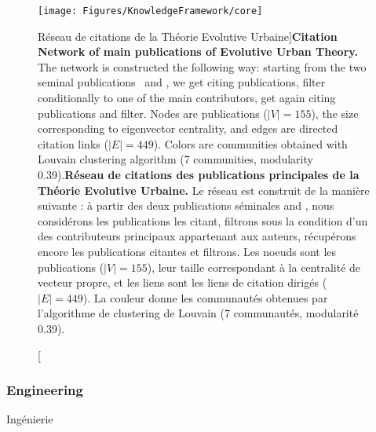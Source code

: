\begin{figure}[h!]
\texttt{[image: Figures/KnowledgeFramework/core]}
\caption[Citation Network of main publications of Evolutive Urban Theory][Réseau de citations de la Théorie Evolutive Urbaine]{\textbf{Citation Network of main publications of Evolutive Urban Theory.} The network is constructed the following way: starting from the two seminal publications~\cite{pumain1997pour} and \cite{sanders1997simpop}, we get citing publications, filter conditionally to one of the main contributors, get again citing publications and filter. Nodes are publications ($\left|V\right|=155$), the size corresponding to eigenvector centrality, and edges are directed citation links ($\left|E\right|=449$). Colors are communities obtained with Louvain clustering algorithm (7 communities, modularity 0.39).\label{fig:knowledgeframework:citnw}}{\textbf{Réseau de citations des publications principales de la Théorie Evolutive Urbaine.} Le réseau est construit de la manière suivante : à partir des deux publications séminales \cite{pumain1997pour} and \cite{sanders1997simpop}, nous considérons les publications les citant, filtrons sous la condition d'un des contributeurs principaux appartenant aux auteurs, récupérons encore les publications citantes et filtrons. Les noeuds sont les publications ($\left|V\right|=155$), leur taille correspondant à la centralité de vecteur propre, et les liens sont les liens de citation dirigés ($\left|E\right|=449$). La couleur donne les communautés obtenues par l'algorithme de clustering de Louvain (7 communautés, modularité 0.39).\label{fig:knowledgeframework:citnw}}
\end{figure}




\subsubsection{Engineering}{Ingénierie}



